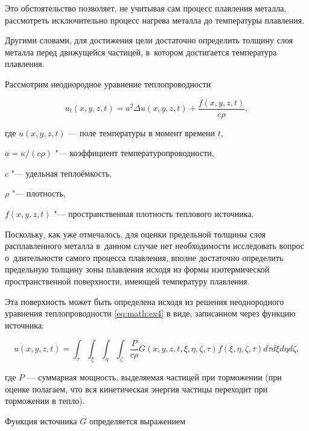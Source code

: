 Это обстоятельство позволяет, не учитывая сам процесс плавления металла, рассмотреть исключительно процесс нагрева металла до температуры плавления.  

Другими словами, для достижения цели достаточно определить толщину слоя металла перед движущейся частицей, в~котором  достигается температура плавления.



 Рассмотрим неоднородное уравнение теплопроводности

\begin{equation}\label{eq:math:ex4}

    u_{t}(x,y,z,t)=a^{2}\Delta u(x,y,z,t) + \frac{f(x,y,z,t)}{c\rho},

\end{equation}

где $u(x,y,z,t)$ --- поле температуры в момент времени $t$, 

$a={\kappa}/({c\rho})$ "--- коэффициент температуропроводности,

$c $ "--- удельная теплоёмкость,

$\rho $ "--- плотность,

$f(x,y,z,t) $ "--- пространственная плотность теплового источника. 

Поскольку, как уже отмечалось, 	 для оценки предельной толщины слоя расплавленного металла в~данном случае нет необходимости исследовать вопрос о~длительности самого процесса плавления, вполне достаточно определить предельную толщину зоны плавления исходя из формы изотермической пространственной поверхности, имеющей температуру плавления. 

Эта поверхность может быть определена исходя из решения  неоднородного уравнения теплопроводности \eqref{eq:math:ex4} в виде, записанном через функцию источника:

\begin{equation}

\label{eq:math:ex5}

    u(x,y,z,t)= \int _\tau \int _\xi \int _\eta \int _\zeta\frac{P}{c\rho}G(x,y,z,t,\xi,\eta,\zeta,\tau)f(\xi,\eta,\zeta,\tau)d\tau d\xi d\eta d\zeta,

\end{equation}

где $P $ --- суммарная мощность, выделяемая частицей при торможении (при оценке полагаем, что вся кинетическая энергия частицы переходит при торможении в тепло). 

Функция источника $G $ определяется выражением

